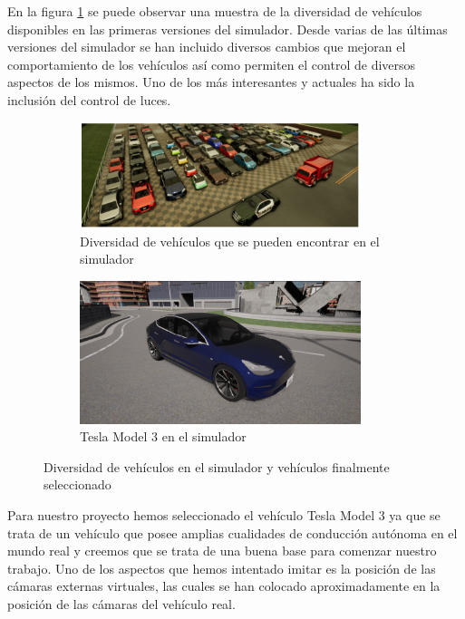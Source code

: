 En la figura \ref{fig:vehiculosCarla} se puede observar una muestra de la diversidad de vehículos disponibles en las primeras versiones del simulador. Desde varias de las últimas versiones del simulador se han incluido diversos cambios que mejoran el comportamiento de los vehículos así como permiten el control de diversos aspectos de los mismos. Uno de los más interesantes y actuales ha sido la inclusión del control de luces.


\begin{figure}[h!]
    \begin{subfigure}[c]{.585\textwidth}
        \centering
        \includegraphics[width=0.9\textwidth]{img/carla3.png}
        \caption{Diversidad de vehículos que se pueden encontrar en el simulador}
        \label{fig:vehiculosCarla}
    \end{subfigure}%
    \begin{subfigure}[c]{.415\textwidth}
        \centering
        \includegraphics[width=0.9\textwidth]{img/model3.png}
        \caption{Tesla Model 3 en el simulador}
        \label{fig:model3}
    \end{subfigure}
    
    \caption{Diversidad de vehículos en el simulador y vehículos finalmente seleccionado}
    \label{fig:diversidadYmodel3}
\end{figure}




Para nuestro proyecto hemos seleccionado el vehículo Tesla Model 3 ya que se trata de un vehículo que posee amplias cualidades de conducción autónoma en el mundo real y creemos que se trata de una buena base para comenzar nuestro trabajo. Uno de los aspectos que hemos intentado imitar es la posición de las cámaras externas virtuales, las cuales se han colocado aproximadamente en la posición de las cámaras del vehículo real. 

